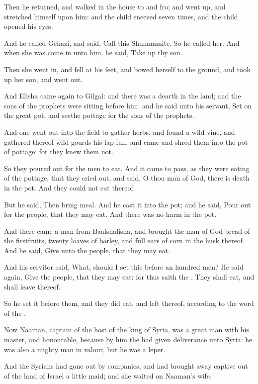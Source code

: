 \Verse Then he returned, and walked in the house to and fro; and went up, and stretched himself upon him: and the child sneezed seven times, and the child opened his eyes.

\Verse And he called Gehazi, and said, Call this Shunammite. So he called her. And when she was come in unto him, he said, Take up thy son.

\Verse Then she went in, and fell at his feet, and bowed herself to the ground, and took up her son, and went out.

\Verse And Elisha came again to Gilgal: and there was a dearth in the land; and the sons of the prophets were sitting before him: and he said unto his servant, Set on the great pot, and seethe pottage for the sons of the prophets.

\Verse And one went out into the field to gather herbs, and found a wild vine, and gathered thereof wild gourds his lap full, and came and shred them into the pot of pottage: for they knew them not.

\Verse So they poured out for the men to eat. And it came to pass, as they were eating of the pottage, that they cried out, and said, O thou man of God, there is death in the pot. And they could not eat thereof.

\Verse But he said, Then bring meal. And he cast it into the pot; and he said, Pour out for the people, that they may eat. And there was no harm in the pot.

\Verse And there came a man from Baalshalisha, and brought the man of God bread of the firstfruits, twenty loaves of barley, and full ears of corn in the husk thereof. And he said, Give unto the people, that they may eat.

\Verse And his servitor said, What, should I set this before an hundred men?  He said again, Give the people, that they may eat: for thus saith the \LORD, They shall eat, and shall leave thereof.

\Verse So he set it before them, and they did eat, and left thereof, according to the word of the \LORD.


\Chapter
\Verse Now Naaman, captain of the host of the king of Syria, was a great man with his master, and honourable, because by him the \LORD had given deliverance unto Syria: he was also a mighty man in valour, but he was a leper.

\Verse And the Syrians had gone out by companies, and had brought away captive out of the land of Israel a little maid; and she waited on Naaman's wife.

